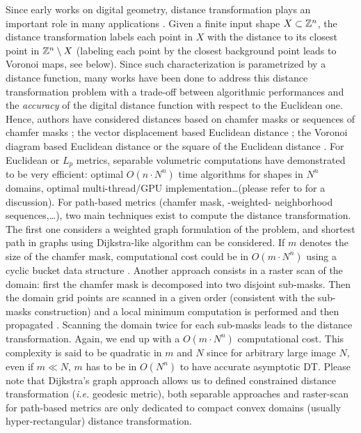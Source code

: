 \documentclass{llncs}
\begin{document}
Since early works on digital geometry, distance transformation plays
an important role in many applications
\cite{Rosenfeld1966,Rosenfeld1968}. Given a finite input shape
$X\subset {\mathbb{Z}}^n$, the distance transformation labels each point in $X$
with the distance to its closest point in ${\mathbb{Z}}^n \setminus X$ (labeling
each point by the closest background point leads to Voronoi maps, see
below). Since such characterization is parametrized by a distance
function, many works have been done to address this distance
transformation problem with a trade-off between algorithmic
performances and the \emph{accuracy} of the digital distance function
with respect to the Euclidean one.  Hence, authors have considered
distances based on chamfer masks
\cite{Rosenfeld1968,borgefors,fouard:ivc:2005} or sequences of chamfer
masks \cite{Rosenfeld1966,mukherjee,Strand2008,DBLP:conf/dgci/NormandSE13};
the vector displacement based Euclidean distance
\cite{danielson,ragnemalm}; the Voronoi diagram based Euclidean
distance \cite{BreuEtAl95,Maurer2003} or the square of the Euclidean
distance \cite{Hirata,roerdnik}.  For Euclidean or $L_p$ metrics,
separable volumetric computations have demonstrated to be very
efficient: optimal $O(n\cdot N^n)$ time algorithms for shapes in $N^n$
domains, optimal multi-thread/GPU implementation\ldots (please refer
to \cite{dcoeurjo_ChapDTWADGMM} for a discussion). For path-based
metrics (chamfer mask, -weighted- neighborhood sequences,\ldots), two
main techniques exist to compute the distance transformation. The
first one considers a weighted graph formulation of the problem, and
shortest path in graphs using Dijkstra-like algorithm can be
considered. If $m$ denotes the size of the chamfer mask, computational
cost could be in $O(m\cdot N^n)$ using a cyclic bucket data structure
\cite{verwer_uniform}. Another approach consists in a raster scan of
the domain: first the chamfer mask is decomposed into two disjoint
sub-masks. Then the domain grid points are scanned in a given order
(consistent with the sub-masks construction) and a local minimum
computation is performed and then propagated
\cite{Rosenfeld1966,borgefors}. Scanning the domain twice for each
sub-masks leads to the distance transformation. Again, we end up with
a $O(m\cdot N^n)$ computational cost. This complexity is said to be
quadratic in $m$ and $N$ since for arbitrary large image $N$, even if
$m \ll N$, $m$ has to be in $O(N^n)$ to have accurate asymptotic DT.
Please note that Dijkstra's graph approach allows us to defined
constrained distance transformation (\emph{i.e.} geodesic metric),
both separable approaches and raster-scan for path-based metrics are
only dedicated to compact convex domains (usually hyper-rectangular)
distance transformation.
\end{document}
